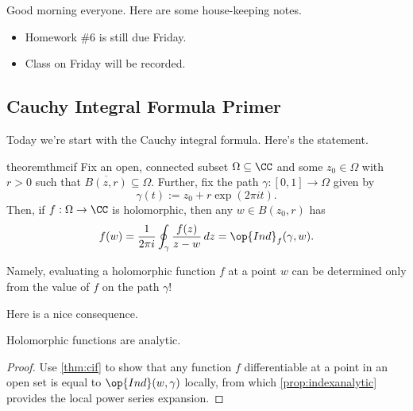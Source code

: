 
Good morning everyone. Here are some house-keeping notes.
\begin{itemize}
	\item Homework \#6 is still due Friday.
	\item Class on Friday will be recorded.
\end{itemize}

\subsection{Cauchy Integral Formula Primer}
Today we're start with the Cauchy integral formula. Here's the statement.
\begin{restatable}{theorem}{thmcif} \label{thm:cif}
	Fix an open, connected subset $\Omega\subseteq\CC$ and some $z_0\in\Omega$ with $r>0$ such that $\overline{B(z,r)}\subseteq\Omega$. Further, fix the path $\gamma:[0,1]\to\Omega$ given by
	\[\gamma(t):=z_0+r\exp(2\pi it).\]
	Then, if $f:\Omega\to\CC$ is holomorphic, then any $w\in B(z_0,r)$ has
	\[f(w)=\frac1{2\pi i}\oint_\gamma\frac{f(z)}{z-w}\,dz=\op{Ind}_f(\gamma,w).\]
\end{restatable}
Namely, evaluating a holomorphic function $f$ at a point $w$ can be determined only from the value of $f$ on the path $\gamma$!

Here is a nice consequence.
\begin{corollary} \label{cor:holoisana}
	Holomorphic functions are analytic.
\end{corollary}
\begin{proof}
	Use \autoref{thm:cif} to show that any function $f$ differentiable at a point in an open set is equal to $\op{Ind}(w,\gamma)$ locally, from which \autoref{prop:indexanalytic} provides the local power series expansion.
\end{proof}

